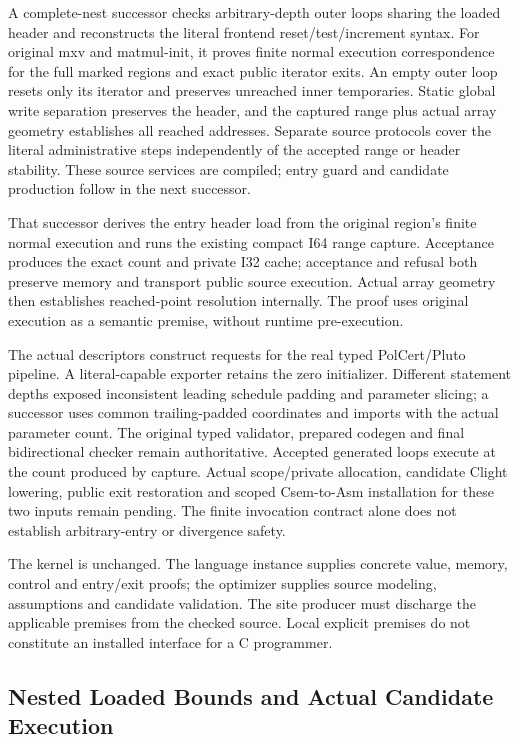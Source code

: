A complete-nest successor checks arbitrary-depth outer loops sharing the
loaded header and reconstructs the literal frontend reset/test/increment
syntax. For original mxv and matmul-init, it proves finite normal execution
correspondence for the full marked regions and exact public iterator exits.
An empty outer loop resets only its iterator and preserves unreached inner
temporaries. Static global write separation preserves the header, and the
captured range plus actual array geometry establishes all reached addresses.
Separate source protocols cover the literal administrative steps independently
of the accepted range or header stability. These source services are compiled;
entry guard and candidate production follow in the next successor.

That successor derives the entry header load from the original region's finite
normal execution and runs the existing compact I64 range capture. Acceptance
produces the exact count and private I32 cache; acceptance and refusal both
preserve memory and transport public source execution. Actual array geometry
then establishes reached-point resolution internally. The proof uses original
execution as a semantic premise, without runtime pre-execution.

The actual descriptors construct requests for the real typed PolCert/Pluto
pipeline. A literal-capable exporter retains the zero initializer. Different
statement depths exposed inconsistent leading schedule padding and parameter
slicing; a successor uses common trailing-padded coordinates and imports with
the actual parameter count. The original typed validator, prepared codegen and
final bidirectional checker remain authoritative. Accepted generated loops
execute at the count produced by capture. Actual scope/private allocation,
candidate Clight lowering, public exit restoration and scoped Csem-to-Asm
installation for these two inputs remain pending. The finite invocation
contract alone does not establish arbitrary-entry or divergence safety.

The kernel is unchanged. The language instance supplies concrete value,
memory, control and entry/exit proofs; the optimizer supplies source modeling,
assumptions and candidate validation. The site producer must discharge the
applicable premises from the checked source. Local explicit premises do not
constitute an installed interface for a C programmer.

\subsection{Nested Loaded Bounds and Actual Candidate Execution}

